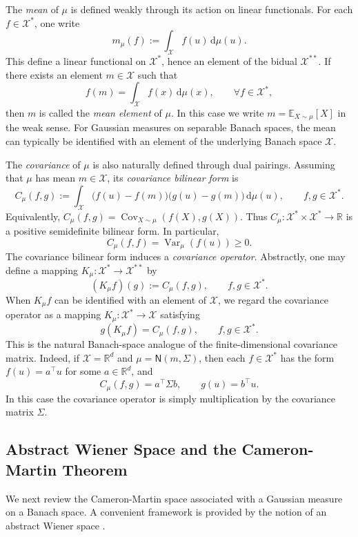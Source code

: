 \documentclass[11pt]{article}
\renewcommand{\d}{\mathrm{d}}
\begin{document}
The \textit{mean} of $\mu$ is defined weakly through its action on linear functionals. For each $f\in\mathcal X^*$, one write
\[
    m_\mu(f)
    :=
    \int_{\mathcal X} f(u)\,\d\mu(u).
\]
This define a linear functional on $\mathcal X^*$, hence an element of the bidual $\mathcal X^{**}$. If there exists an element $m\in\mathcal X$ such that
\[
    f(m)
    =
    \int_{\mathcal X} f(x)\,\d\mu(x),
    \qquad \forall f\in\mathcal X^*,
\]
then $m$ is called the \textit{mean element} of $\mu$. In this case we write $m = \mathbb E_{X\sim\mu}[X]$ in the weak sense. For Gaussian measures on separable Banach spaces, the mean can typically be identified with an element of the underlying Banach space $\mathcal X$.

The \textit{covariance} of $\mu$ is also naturally defined through dual pairings. Assuming that $\mu$ has mean $m\in\mathcal X$, its \textit{covariance bilinear form} is
\[
    C_\mu(f,g)
    :=
    \int_{\mathcal X}
    \bigl(f(u)-f(m)\bigr)
    \bigl(g(u)-g(m)\bigr)
    \,\d\mu(u),
    \qquad f,g\in\mathcal X^*.
\]
Equivalently, $C_\mu(f,g)=\operatorname{Cov}_{X\sim\mu}(f(X),g(X))$.
Thus $C_\mu:\mathcal X^*\times \mathcal X^*\to\mathbb R$ is a positive semidefinite bilinear form. In particular,
\[
    C_\mu(f,f)
    =
    \operatorname{Var}_\mu(f(u))
    \ge 0.
\]
The covariance bilinear form induces a \textit{covariance operator}. Abstractly, one may define a mapping $K_\mu:\mathcal X^*\to \mathcal X^{**}$
by
\[
    (K_\mu f)(g)
    :=
    C_\mu(f,g),
    \qquad f,g\in\mathcal X^*.
\]
When $K_\mu f$ can be identified with an element of $\mathcal X$, we regard the covariance operator as a mapping $K_\mu:\mathcal X^*\to \mathcal X$
satisfying
\[
    g(K_\mu f)
    =
    C_\mu(f,g),
    \qquad f,g\in\mathcal X^*.
\]
This is the natural Banach-space analogue of the finite-dimensional covariance matrix. Indeed, if $\mathcal X=\mathbb R^d$ and $\mu=\mathsf N(m,\Sigma)$, then each $f\in\mathcal X^*$ has the form $f(u)=a^\top u$ for some $a\in\mathbb R^d$, and
\[
    C_\mu(f,g)
    =
    a^\top \Sigma b,
    \qquad
    g(u)=b^\top u.
\]
In this case the covariance operator is simply multiplication by the covariance matrix $\Sigma$.


\subsection{Abstract Wiener Space and the Cameron-Martin Theorem}
\label{app:cameron_martin}

We next review the Cameron-Martin space associated with a Gaussian measure on a Banach space. A convenient framework is provided by the notion of an abstract Wiener space \citep{stroock2010probability}.
\end{document}

